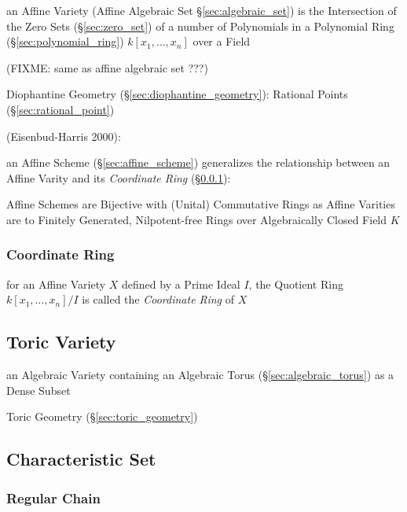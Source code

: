 an Affine Variety (Affine Algebraic Set \S\ref{sec:algebraic_set}) is the
Intersection of the Zero Sets (\S\ref{sec:zero_set}) of a number of Polynomials
in a Polynomial Ring (\S\ref{sec:polynomial_ring}) $k[x_1,\ldots,x_n]$ over a
Field

(FIXME: same as affine algebraic set ???)

\fist Diophantine Geometry (\S\ref{sec:diophantine_geometry}): Rational Points
(\S\ref{sec:rational_point})

(Eisenbud-Harris 2000):

\fist an Affine Scheme (\S\ref{sec:affine_scheme}) generalizes the relationship
between an Affine Varity and its \emph{Coordinate Ring}
(\S\ref{sec:coordinate_ring}):

Affine Schemes are Bijective with (Unital) Commutative Rings as Affine Varities
are to Finitely Generated, Nilpotent-free Rings over Algebraically Closed Field
$K$



\subsubsection{Coordinate Ring}\label{sec:coordinate_ring}

for an Affine Variety $X$ defined by a Prime Ideal $I$, the Quotient Ring
$k[x_1,\ldots,x_n]/I$ is called the \emph{Coordinate Ring} of $X$



\subsection{Toric Variety}\label{sec:toric_variety}

an Algebraic Variety containing an Algebraic Torus (\S\ref{sec:algebraic_torus})
as a Dense Subset

\fist Toric Geometry (\S\ref{sec:toric_geometry})



\subsection{Characteristic Set}\label{sec:characteristic_set}

\subsubsection{Regular Chain}\label{sec:regular_chain}



